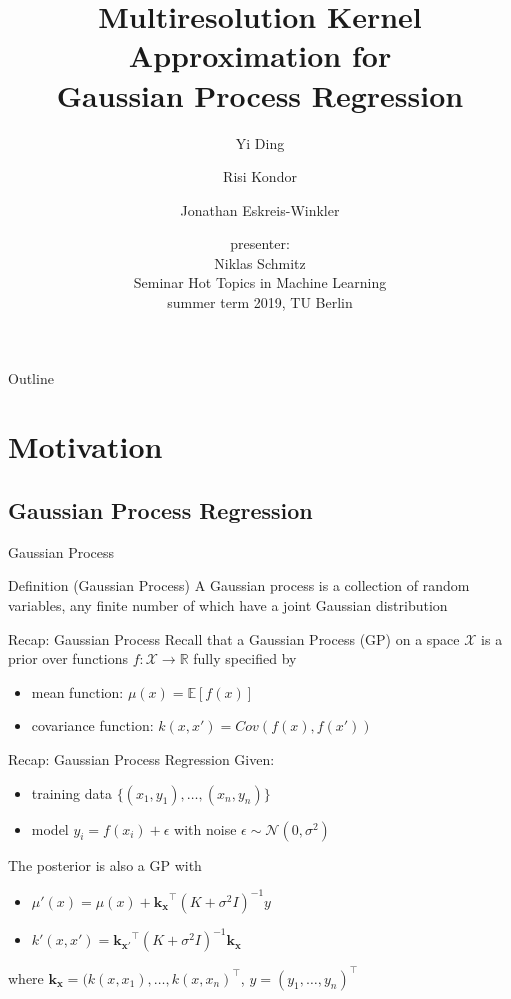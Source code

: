 \documentclass{beamer}
\title{Multiresolution Kernel Approximation for\\ Gaussian Process Regression}
\author{Yi Ding\inst{1} \and Risi Kondor\inst{1}\inst{2} \and Jonathan Eskreis-Winkler\inst{2}}
\institute[Universities of Somewhere and Elsewhere] %
{
  \inst{1}%
  Department of Computer Science\\
  \inst{2}%
  Department of Statistics\\
  The University of Chicago}
\date{presenter:\\
Niklas Schmitz\\
Seminar Hot Topics in Machine Learning\\
summer term 2019, TU Berlin}
\begin{document}
\begin{frame}
  \titlepage
\end{frame}

\begin{frame}{Outline}
  \tableofcontents
\end{frame}


\section{Motivation}

\subsection{Gaussian Process Regression}

\begin{frame}{Gaussian Process}
\begin{block}{Definition (Gaussian Process)}
    A Gaussian process is a collection of random variables, any
    finite number of which have a joint Gaussian distribution
\end{block}
    
\end{frame}

\begin{frame}{Recap: Gaussian Process}
  Recall that a Gaussian Process (GP) on a space $\mathcal{X}$ is a prior over functions $f: \mathcal{X}\to \mathbb{R}$ fully specified by\pause
  \begin{itemize}
      \item<2-> mean function: $\mu(x) = \mathbb{E}[f(x)]$
      \item<3-> covariance function: $k(x,x') = Cov(f(x), f(x'))$
  \end{itemize}
\end{frame}

\begin{frame}{Recap: Gaussian Process Regression}
    Given:
    \begin{itemize}
        \item training data $\{(x_1,y_1),\hdots ,(x_n,y_n)\}$
        \item model $y_i=f(x_i)+\epsilon$ with noise $\epsilon \sim \mathcal{N}(0,\sigma^2)$
    \end{itemize}
    The posterior is also a GP with\pause
    \begin{itemize}
        \item $\mu'(x) = \mu(x) + \mathbf{k_x}^\top(K+\sigma^2I)^{-1}y$
        \item $k'(x,x') = \mathbf{k_{x'}}^\top(K+\sigma^2I)^{-1}\mathbf{k_x}$
    \end{itemize}
    where $\mathbf{k_x}=(k(x,x_1),\hdots,k(x,x_n)^\top$, $y=(y_1,\hdots,y_n)^\top$
\end{frame}
\end{document}
